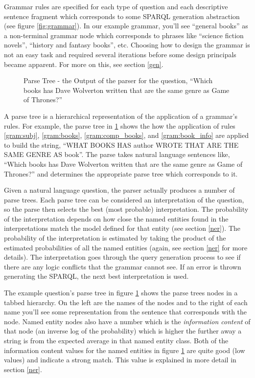 \documentclass[11pt]{article}
\begin{document}
{Grammar rules are specified for each type of question and each descriptive sentence
fragment which corresponds to some SPARQL generation abstraction (see 
figure \ref{fig:grammar}). In our example grammar, you'll see ``general books'' as a
non-terminal grammar node which corresponds to phrases like ``science fiction novels'',
``history and fantasy books'', etc. Choosing how to design the grammar is not an
easy task and required several iterations before some design principals became apparent.
For more on this, see section \ref{gen}. 

\begin{figure}[h!]
\caption{Parse Tree - the Output of the parser for the question, 
``Which books has Dave Wolverton written that are the same genre as Game of Thrones?''}
\label{fig:parse}
\end{figure}

A parse tree is a hierarchical representation of the application of a grammar's rules.
For example, the parse tree in \ref{fig:parse} shows the how the application of rules
\ref{gram:subj}, \ref{gram:books}, \ref{gram:comp_books}, and \ref{gram:book_info}
are applied to build the string, 
``WHAT BOOKS HAS author WROTE THAT ARE THE SAME GENRE AS book''. The parse takes
natural language sentences like, ``Which books has Dave Wolverton written that
are the same genre as Game of Thrones?'' and determines the appropriate parse tree which
corresponds to it.

Given a natural language question, the parser actually produces a number of
parse trees. Each parse tree can be considered an interpretation of the question,
so the parse then selects the best (most probable) interpretation. The probability
of the interpretation depends on how close the named entities found in 
the interpretations match the model defined for that entity (see section \ref{ner}). 
The probability of the interpretation is estimated by taking the product of the 
estimated probabilities of all the named entities (again, see section \ref{ner} for
more details). The interpretation goes through the query generation process to see if 
there are any logic conflicts that the grammar cannot see. If an error is thrown generating the
SPARQL, the next best interpretation is used.

The example question's parse tree in figure \ref{fig:parse} shows the parse trees nodes
in a tabbed hierarchy. On the left are the names of the nodes and to
the right of each name you'll see some representation from the sentence that 
corresponds with the node. Named entity nodes also have a number which is the
{\em information content} of that node (an inverse log of the probability) which is higher
the further away a string is from the expected average in that named entity class. Both
of the information content values for the named entities in figure \ref{fig:parse} are
quite good (low values) and indicate a strong match. This value is explained in more detail in section \ref{ner}.

}
\end{document}
